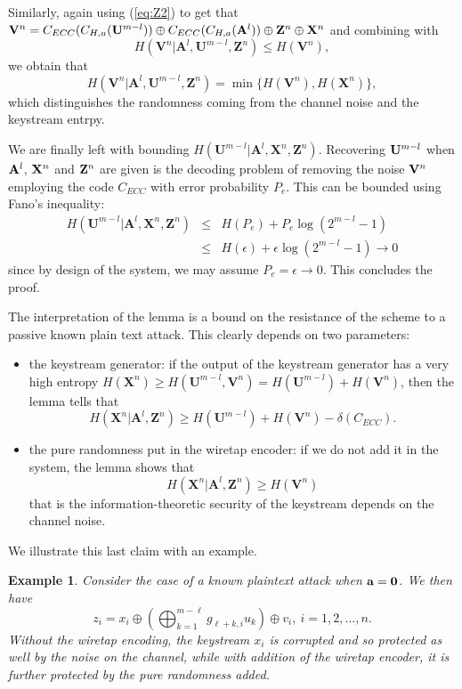 \documentclass{article}[11pt]
\newcommand{\am}{\mathbf{A}}
\newcommand{\um}{\mathbf{U}}
\newcommand{\vm}{\mathbf{V}}
\newcommand{\xm}{\mathbf{X}}
\newcommand{\zm}{\mathbf{Z}}
\newtheorem{example}{Example}
\newenvironment{proof}{\noindent {\bf Proof. \ }}{\hfill \vrule height 2pt depth 4pt width 6pt\par\noindent}
\begin{document}
\begin{proof}
Similarly, again using (\ref{eq:Z2}) to get that ${\bf V}^n= C_{ECC}(C_{H,u}({\bf U}^{m-l}))
\oplus C_{ECC}(C_{H,a}({\bf A}^l))\oplus {\bf Z}^n\oplus{\bf X}^n$ and combining with
\[
H(\vm^n|\am^l,\um^{m-l},\zm^n)\leq H(\vm^n),
\]
we obtain that
\[
H(\vm^n|\am^l,\um^{m-l},\zm^n) = \min \{H(\vm^n), H(\xm^n) \},
\]
which distinguishes the randomness coming from the channel noise
and the keystream entrpy.

We are finally left with bounding $H(\um^{m-l}|\am^l,\xm^n,\zm^n)$.
Recovering ${\bf U}^{m-l}$ when ${\bf A}^l$, ${\bf X}^n$ and
${\bf Z}^n$ are given is the decoding problem of removing the noise
${\bf V}^n$ employing the code $C_{ECC}$ with error probability $P_e$.
This can be bounded using Fano's inequality:
\begin{eqnarray*}
H(\um^{m-l}|\am^l,\xm^n,\zm^n)
&\leq &  H(P_e) + P_e \log(2^{m-l}-1)\\
&\leq &  H(\epsilon)+\epsilon \log(2^{m-l}-1) \rightarrow 0
\end{eqnarray*}
since by design of the system, we may assume $P_e=\epsilon\rightarrow 0$.
This concludes the proof.
\end{proof}

The interpretation of the lemma is a bound on the resistance of
the scheme to a passive known plain text attack. This clearly
depends on two parameters:
\begin{itemize}
\item
the keystream generator: if the output of the keystream generator
has a very high entropy $H(\xm^n)\geq H(\um^{m-l},\vm^n)=H(\um^{m-l})+H(\vm^n)$, then
the lemma tells that
\[
H(\xm^n|\am^l,\zm^n)\geq H(\um^{m-l})+H(\vm^n)-\delta(C_{ECC}).
\]
\item
the pure randomness put in the wiretap encoder: if we do not add
it in the system, the lemma shows that
\[
H(\xm^n|\am^l,\zm^n)\geq H(\vm^n)
\]
that is the information-theoretic security of the keystream
depends on the channel noise.
\end{itemize}
We illustrate this last claim with an example.
\begin{example}\label{ex:kpa}\rm
Consider the case of a known plaintext attack when ${\bf a} = {\bf 0}$.
We then have
\[
z_i= x_i\oplus (\bigoplus_{k=1}^{m-\ell} g_{\ell+k,i} u_k )\oplus v_i,
~i=1,2,...,n.
\]
Without the wiretap encoding, the keystream $x_i$ is corrupted and
so protected as well by the noise on the channel, while with
addition of the wiretap encoder, it is further protected by the
pure randomness added.
\end{example}
\end{document}
